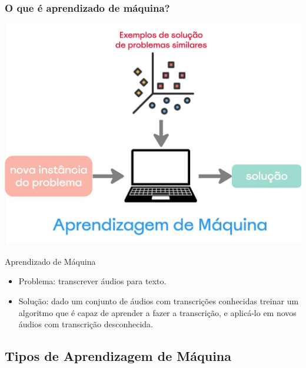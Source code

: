 \begin{frame}
    \frametitle{O que é aprendizado de máquina?}
    \begin{center}
        \includegraphics[height=0.4\paperheight]{./imgs/fig5-ml.jpg}
    \end{center}
    \begin{block}{Aprendizado de Máquina}
        \begin{itemize}
            \item Problema: transcrever áudios para texto.
            \item Solução: dado um conjunto de áudios com transcrições conhecidas treinar um algoritmo que é capaz de aprender a fazer a transcrição, e aplicá-lo em novos áudios com transcrição desconhecida.
        \end{itemize}
    \end{block}
\end{frame}

\subsection{Tipos de Aprendizagem de Máquina}

